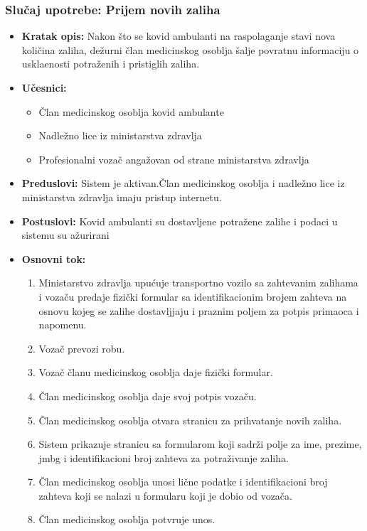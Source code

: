\documentclass[titlepage]{article}
\begin{document}
\subsubsection{Slučaj upotrebe: Prijem novih zaliha}
\begin{itemize}
\item \textbf{Kratak opis:} Nakon \v{s}to se kovid ambulanti na raspolaganje stavi nova koli\v{c}ina zaliha, de\v{z}urni \v{c}lan medicinskog osoblja \v{s}alje povratnu informaciju o uskla\dj{}enosti potra\v{z}enih i pristiglih zaliha.
\item \textbf{Učesnici:}
\begin{itemize}
    \item \v{C}lan medicinskog osoblja kovid ambulante
    \item Nadle\v{z}no lice iz ministarstva zdravlja
    \item Profesionalni vozač angažovan od strane ministarstva zdravlja
\end{itemize}
 \item \textbf{Preduslovi:} Sistem je aktivan.Član medicinskog osoblja i nadležno lice iz ministarstva zdravlja imaju pristup internetu.
 \item \textbf{Postuslovi:} Kovid ambulanti su dostavljene potra\v{z}ene zalihe i podaci u sistemu su a\v{z}urirani 
 \item \textbf{Osnovni tok:}
 \begin{enumerate}
    \item Ministarstvo zdravlja upu\'{c}uje transportno vozilo sa zahtevanim zalihama i vozaču predaje fizički formular  sa identifikacionim brojem zahteva na osnovu kojeg se zalihe dostavljjaju i praznim poljem za potpis primaoca i napomenu.
   \item  Vozač prevozi robu.
    \item Voza\v{c} \v{c}lanu medicinskog osoblja daje fizi\v{c}ki formular.
    \item \v{C}lan medicinskog osoblja daje svoj potpis voza\v{c}u.
    \item \v{C}lan medicinskog osoblja otvara stranicu za prihvatanje novih zaliha.
    \item Sistem prikazuje stranicu sa formularom koji sadr\v{z}i polje za ime, prezime, jmbg i identifikacioni broj zahteva za potra\v{z}ivanje zaliha.
    \item \v{C}lan medicinskog osoblja unosi li\v{c}ne podatke i identifikacioni broj zahteva koji se nalazi u formularu koji je dobio od voza\v{c}a.
    \item \v{C}lan medicinskog osoblja potvr\dj{}uje unos.

\end{enumerate}
\end{itemize}
\end{document}
